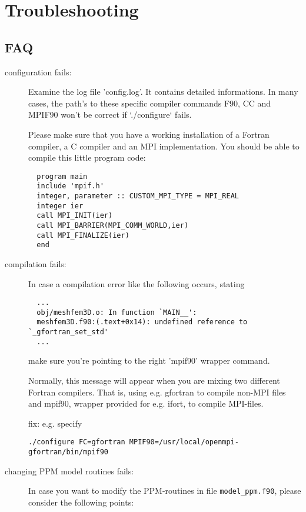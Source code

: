 \chapter{Troubleshooting}\label{cha:Troubleshooting}

\section*{FAQ}

\begin{description}
\item [configuration fails:]
Examine the log file 'config.log'. It contains detailed informations.
In many cases, the path's to these specific compiler commands F90,
CC and MPIF90 won't be correct if `./configure` fails.

Please make sure that you have a working installation of a Fortran compiler,
a C compiler and an MPI implementation. You should be able to compile this
little program code:
   
{\footnotesize   
\begin{verbatim}   
  program main
  include 'mpif.h'
  integer, parameter :: CUSTOM_MPI_TYPE = MPI_REAL 
  integer ier
  call MPI_INIT(ier)
  call MPI_BARRIER(MPI_COMM_WORLD,ier)
  call MPI_FINALIZE(ier)
  end
\end{verbatim}
}

\item [compilation fails:] 
In case a compilation error like the following occurs, stating

{\footnotesize
\begin{verbatim}
  ...
  obj/meshfem3D.o: In function `MAIN__': 
  meshfem3D.f90:(.text+0x14): undefined reference to `_gfortran_set_std' 
  ...
\end{verbatim}
}
\noindent
make sure you're pointing to the right 'mpif90' wrapper command.

Normally, this message will appear when you are mixing two different Fortran
compilers. That is, using e.g. gfortran to compile non-MPI files
and mpif90, wrapper provided for e.g. ifort, to compile MPI-files.

fix: e.g. specify
\begin{verbatim}
./configure FC=gfortran MPIF90=/usr/local/openmpi-gfortran/bin/mpif90
\end{verbatim}

\item [changing PPM model routines fails:]
In case you want to modify the PPM-routines in file \texttt{model\_ppm.f90}, please consider the following points:


\end{description}
